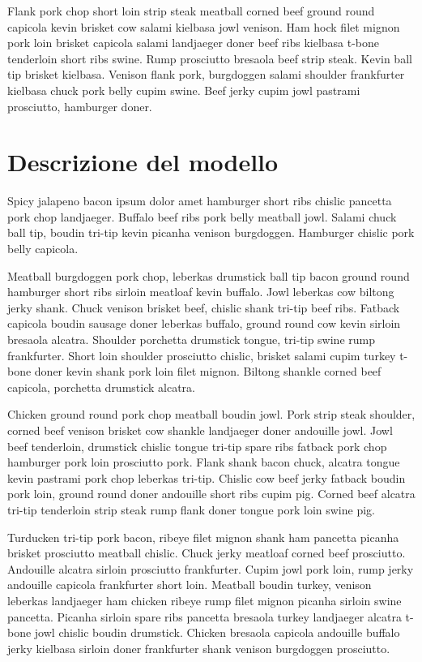 \documentclass[a4paper]{article}
\begin{document}
Flank pork chop short loin strip steak meatball corned beef ground round capicola kevin brisket cow salami kielbasa jowl venison. Ham hock filet mignon pork loin brisket capicola salami landjaeger doner beef ribs kielbasa t-bone tenderloin short ribs swine. Rump prosciutto bresaola beef strip steak. Kevin ball tip brisket kielbasa. Venison flank pork, burgdoggen salami shoulder frankfurter kielbasa chuck pork belly cupim swine. Beef jerky cupim jowl pastrami prosciutto, hamburger doner.

\section{Descrizione del modello}

Spicy jalapeno bacon ipsum dolor amet hamburger short ribs chislic pancetta pork chop landjaeger. Buffalo beef ribs pork belly meatball jowl. Salami chuck ball tip, boudin tri-tip kevin picanha venison burgdoggen. Hamburger chislic pork belly capicola.

Meatball burgdoggen pork chop, leberkas drumstick ball tip bacon ground round hamburger short ribs sirloin meatloaf kevin buffalo. Jowl leberkas cow biltong jerky shank. Chuck venison brisket beef, chislic shank tri-tip beef ribs. Fatback capicola boudin sausage doner leberkas buffalo, ground round cow kevin sirloin bresaola alcatra. Shoulder porchetta drumstick tongue, tri-tip swine rump frankfurter. Short loin shoulder prosciutto chislic, brisket salami cupim turkey t-bone doner kevin shank pork loin filet mignon. Biltong shankle corned beef capicola, porchetta drumstick alcatra.

Chicken ground round pork chop meatball boudin jowl. Pork strip steak shoulder, corned beef venison brisket cow shankle landjaeger doner andouille jowl. Jowl beef tenderloin, drumstick chislic tongue tri-tip spare ribs fatback pork chop hamburger pork loin prosciutto pork. Flank shank bacon chuck, alcatra tongue kevin pastrami pork chop leberkas tri-tip. Chislic cow beef jerky fatback boudin pork loin, ground round doner andouille short ribs cupim pig. Corned beef alcatra tri-tip tenderloin strip steak rump flank doner tongue pork loin swine pig.

Turducken tri-tip pork bacon, ribeye filet mignon shank ham pancetta picanha brisket prosciutto meatball chislic. Chuck jerky meatloaf corned beef prosciutto. Andouille alcatra sirloin prosciutto frankfurter. Cupim jowl pork loin, rump jerky andouille capicola frankfurter short loin. Meatball boudin turkey, venison leberkas landjaeger ham chicken ribeye rump filet mignon picanha sirloin swine pancetta. Picanha sirloin spare ribs pancetta bresaola turkey landjaeger alcatra t-bone jowl chislic boudin drumstick. Chicken bresaola capicola andouille buffalo jerky kielbasa sirloin doner frankfurter shank venison burgdoggen prosciutto.
\end{document}
